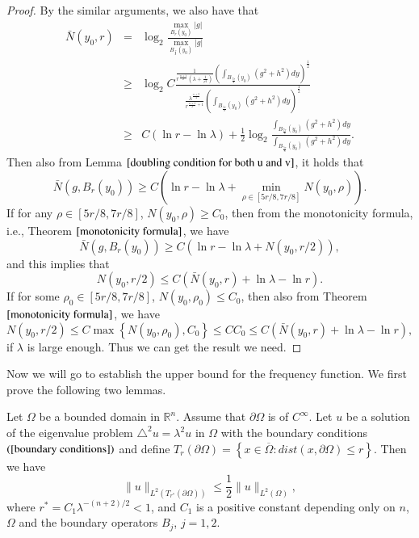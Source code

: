 \documentclass[a4paper, 12pt, onecolumn]{article} \textwidth 148mm
\begin{document}
\begin{proof}
By the similar arguments, we also have that
\begin{eqnarray*}
\bar{N}(y_0,r)&=&\log_2\frac{\max\limits_{B_r(y_0)}|g|}{\max\limits_{B_{\frac{r}{2}}(y_0)}|g|}
\\&\geq&\log_2C\frac{\frac{1}{r^{\frac{n+1}{2}}\left(\lambda+\frac{1}{r^2}\right)}
\left(\int_{B_{\frac{7r}{8}}(y_0)}(g^2+h^2)dy\right)^{\frac{1}{2}}}
{\frac{\lambda^{\frac{n+3}{4}}}{r^{\frac{n+1}{2}+1}}\left(\int_{B_{\frac{5r}{8}}(y_0)}(g^2+h^2)dy\right)^{\frac{1}{2}}}
\\&\geq&C(\ln r-\ln\lambda)+\frac{1}{2}\log_2
\frac{\int_{B_{\frac{7r}{8}}(y_0)}(g^2+h^2)dy}{\int_{B_{\frac{5r}{8}}(y_0)}(g^2+h^2)dy}.
\end{eqnarray*}
Then also from Lemma $\ref{doubling condition for both u and v}$, it holds that
\begin{equation*}
\bar{N}(g,B_r(y_0))\geq C(\ln r-\ln \lambda+\min_{\rho\in[5r/8,7r/8]}N(y_0,\rho)).
\end{equation*}
If for any $\rho\in[5r/8,7r/8]$,  $N(y_0,\rho)\geq C_0$, then from the monotonicity formula, i.e., Theorem $\ref{monotonicity formula}$, we have
\begin{equation*}
\bar{N}(g,B_r(y_0))\geq C(\ln r-\ln\lambda+N(y_0,r/2)),
\end{equation*}
and this implies that
\begin{equation*}
N(y_0,r/2)\leq C(\bar{N}(y_0,r)+\ln\lambda-\ln r).
\end{equation*}
If for some $\rho_0\in[5r/8,7r/8]$, $N(y_0,\rho_0)\leq C_0$,
then also from Theorem $\ref{monotonicity formula}$, we have
\begin{equation*}
N(y_0,r/2)\leq C\max\left\{N(y_0,\rho_0),C_0\right\}\leq CC_0\leq C(\bar{N}(y_0,r)+\ln\lambda-\ln r),
\end{equation*}
if $\lambda$ is large enough. Thus we can get the result we need.
\end{proof}

Now we will go to establish the upper bound for the frequency function. We first prove the following two lemmas.

\begin{lemma}\label{neighborhood of the nonanalytic point}
Let $\Omega$ be a bounded domain in $\mathbb{R}^n$. Assume that $\partial\Omega$ is of $C^{\infty}$.
Let $u$ be a solution of the eigenvalue problem $\triangle^2u=\lambda^2u$ in $\Omega$ with the boundary conditions $(\ref{boundary conditions})$ and define
$T_r(\partial\Omega)=\left\{x\in\overline{\Omega}:dist(x,\partial\Omega)\leq r\right\}$. Then we have
\begin{equation}
\|u\|_{L^2(T_{r^*}(\partial\Omega))}\leq\frac{1}{2}\|u\|_{L^2(\Omega)},
\end{equation}
where $r^*=C_1\lambda^{-(n+2)/2}<1$, and $C_1$ is a positive constant depending only on $n$, $\Omega$ and the boundary operators $B_j$, $j=1,2$.
\end{lemma}
\end{document}

